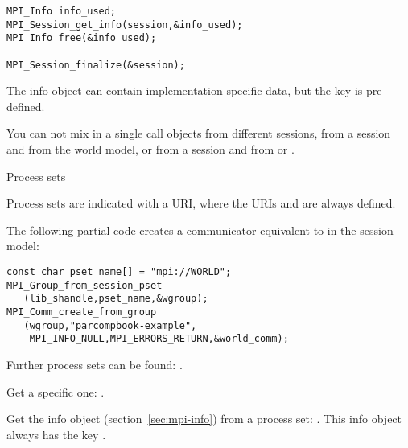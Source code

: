 \begin{mpifour}
\begin{lstlisting}
MPI_Info info_used;
MPI_Session_get_info(session,&info_used);
MPI_Info_free(&info_used);

MPI_Session_finalize(&session);
\end{lstlisting}

The info object can contain implementation-specific data,
but the key  is pre-defined.

You can not mix in a single call objects
from different sessions,
from a session and from the world model,
or from a session and from 
or .

 {Process sets}

Process sets are indicated with a \acf{URI},
where the \acp{URI}  and 
are always defined.

The following partial code creates a communicator equivalent to 
in the session model:
\begin{lstlisting}
const char pset_name[] = "mpi://WORLD";
MPI_Group_from_session_pset
   (lib_shandle,pset_name,&wgroup);
MPI_Comm_create_from_group
   (wgroup,"parcompbook-example",
    MPI_INFO_NULL,MPI_ERRORS_RETURN,&world_comm);
\end{lstlisting}

Further process sets can be found: .

Get a specific one: .

Get the info object (section~\ref{sec:mpi-info}) from a process set:
.
This info object always has the key .

\begin{comment}
7.2.4 When using the Sessions Model (Section 11.3) for initialization of MPI
re- sources, MPI_COMM_WORLD and MPI_COMM_SELF are not valid for use as
a communica- tor.

11.3 MPI objects derived from the Sessions Model shall not be
intermixed in a single MPI procedure call with MPI objects derived
from the World Model.

Are those two at odds? The first one seems to imply that in the second
statement objects from the world model can't even exist.
\end{comment}

\end{mpifour}

